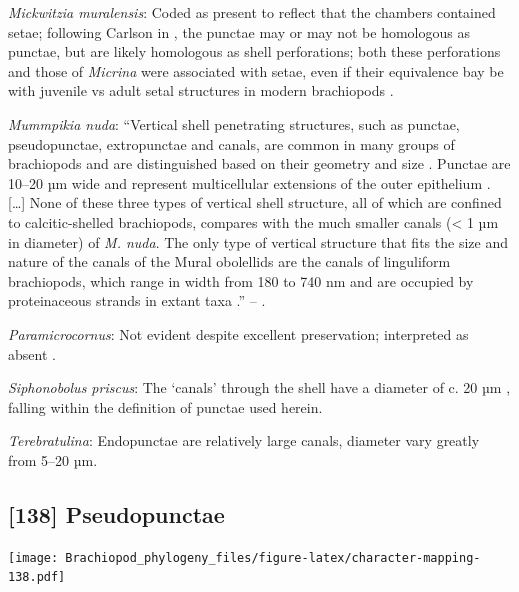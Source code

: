 \documentclass[openany]{book}
\begin{document}
\hypertarget{Mickwitzia_muralensis-coding-137}{}
\emph{Mickwitzia muralensis}: Coded as present to reflect that the
chambers contained setae; following Carlson in
\citet{Williams2007Supplement}, the punctae may or may not be homologous
as punctae, but are likely homologous as shell perforations; both these
perforations and those of \emph{Micrina} were associated with setae,
even if their equivalence bay be with juvenile vs adult setal structures
in modern brachiopods \citep[p.~397]{Balthasar2004Shellstructure}.

\hypertarget{Mummpikia_nuda-coding-137}{}
\emph{Mummpikia nuda}: ``Vertical shell penetrating structures, such as
punctae, pseudopunctae, extropunctae and canals, are common in many
groups of brachiopods and are distinguished based on their geometry and
size \citep{Williams1997Introduction}. Punctae are 10--20 µm wide and
represent multicellular extensions of the outer epithelium
\citep{Owen1969Thecaecum}. {[}\ldots{}{]} None of these three types of
vertical shell structure, all of which are confined to calcitic-shelled
brachiopods, compares with the much smaller canals (\textless{} 1 µm in
diameter) of \emph{M. nuda}. The only type of vertical structure that
fits the size and nature of the canals of the Mural obolellids are the
canals of linguliform brachiopods, which range in width from 180 to 740
nm and are occupied by proteinaceous strands in extant taxa
\citetext{\citealp[1994]{Williams1992Structureof}; \citealp{Williams1997Introduction}}.''
-- \citet{Balthasar2008iMummpikia}.

\hypertarget{Paramicrocornus-coding-137}{}
\emph{Paramicrocornus}: Not evident despite excellent preservation;
interpreted as absent \citep{Zhang2018Ahyolithid}.

\hypertarget{Siphonobolus_priscus-coding-137}{}
\emph{Siphonobolus priscus}: The `canals' through the shell have a
diameter of c. 20 µm \citep[text-fig. 2a]{Williams2004Chemicostructure},
falling within the definition of punctae used herein.

\hypertarget{Terebratulina-coding-137}{}
\emph{Terebratulina}: Endopunctae are relatively large canals, diameter
vary greatly from 5--20 µm.

\subsection*{{[}138{]} Pseudopunctae}\label{pseudopunctae}

\texttt{[image: Brachiopod\_phylogeny\_files/figure-latex/character-mapping-138.pdf]}
\end{document}

